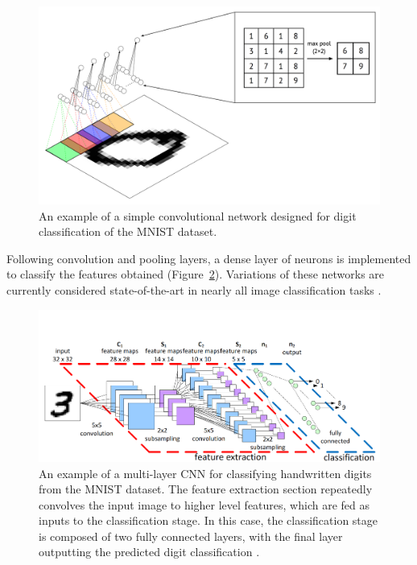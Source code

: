 \documentclass[12pt,oneside,onecolumn,a4paper]{article}
\begin{document}
\begin{figure}[H]
\begin{center}
\includegraphics[width=0.8\columnwidth]{figures/convnet}
\caption{An example of a simple convolutional network designed for digit classification of the MNIST dataset. \label{fig:convolutional_mnist}}%
\end{center}
\end{figure}

Following convolution and pooling layers, a dense layer of neurons is implemented to classify the features obtained (Figure~\ref{fig:mnist_full}). Variations of these networks are currently considered state-of-the-art in nearly all image classification tasks \citep{Koushik2016UnderstandingCN}.

\begin{figure}[H]
\begin{center}
\includegraphics[width=0.8\columnwidth]{figures/CNN/CNN}
\caption{An example of a multi-layer CNN for classifying handwritten digits from the MNIST dataset. The feature extraction section repeatedly convolves the input image to higher level features, which are fed as inputs to the classification stage. In this case, the classification stage is composed of two fully connected layers, with the final layer outputting the predicted digit classification \citep{peemen_mesman_corporaal_2011}. \label{fig:mnist_full}%
}
\end{center}
\end{figure}
\end{document}
